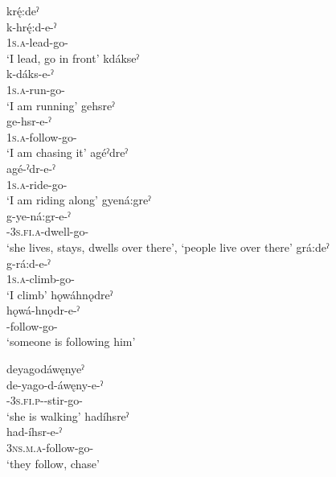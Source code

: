 \ea\label{ex:complmotex} 
\ea krę́:deˀ\\
\gll k-hrę́:d-e-ˀ\\
 \textsc{1s.a}-lead-go-{\stative}\\
\glt `I lead, go in front'
\ex kdákseˀ\\
\gll k-dáks-e-ˀ\\
 \textsc{1s.a}-run-go-{\stative}\\
\glt `I am running'
\ex gehsreˀ\\
\gll ge-hsr-e-ˀ\\
 \textsc{1s.a}-follow-go-{\stative}\\
\glt `I am chasing it'
\ex agéˀdreˀ\\
\gll agé-ˀdr-e-ˀ\\
 \textsc{1s.a}-ride-go-{\stative}\\
\glt `I am riding along'
\ex gyená:greˀ \\
\gll g-ye-ná:gr-e-ˀ\\
 {\cislocative}-\textsc{3s.fi.a}-dwell-go-{\stative}\\
\glt ‘she lives, stays, dwells over there’, `people live over there'
\ex grá:deˀ\\
\gll g-rá:d-e-ˀ\\
 \textsc{1s.a}-climb-go-{\stative}\\
\glt `I climb'
\ex hǫwáhnǫdreˀ\\
\gll hǫwá-hnǫdr-e-ˀ\\
 -follow-go-{\stative}\\
\glt `someone is following him'

\ex deyagodáwęnyeˀ\\
\gll de-yago-d-áwęny-e-ˀ\\
 {\dualic}-\textsc{3s.fi.p}-{\semireflexive}-stir-go-{\stative}\\
\glt `she is walking'
\ex hadíhsreˀ\\
\gll had-íhsr-e-ˀ\\
 \textsc{3ns.m.a}-follow-go-{\stative}\\
\glt `they follow, chase'
\z
\z

